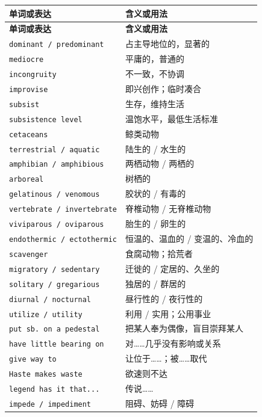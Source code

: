 \documentclass[UTF8,zihao=-4]{ctexart}
\begin{document}
\begin{longtable}{>{\raggedright\arraybackslash}p{4.9cm} >{\raggedright\arraybackslash}p{9.6cm}}
\toprule
\textbf{单词或表达} & \textbf{含义或用法} \\
\midrule
\endfirsthead
\toprule
\textbf{单词或表达} & \textbf{含义或用法} \\
\midrule
\endhead
\texttt{dominant / predominant} & 占主导地位的，显著的 \\
\texttt{mediocre} & 平庸的，普通的 \\
\texttt{incongruity} & 不一致，不协调 \\
\texttt{improvise} & 即兴创作；临时凑合 \\
\texttt{subsist} & 生存，维持生活 \\
\texttt{subsistence level} & 温饱水平，最低生活标准 \\
\texttt{cetaceans} & 鲸类动物 \\
\texttt{terrestrial / aquatic} & 陆生的 / 水生的 \\
\texttt{amphibian / amphibious} & 两栖动物 / 两栖的 \\
\texttt{arboreal} & 树栖的 \\
\texttt{gelatinous / venomous} & 胶状的 / 有毒的 \\
\texttt{vertebrate / invertebrate} & 脊椎动物 / 无脊椎动物 \\
\texttt{viviparous / oviparous} & 胎生的 / 卵生的 \\
\texttt{endothermic / ectothermic} & 恒温的、温血的 / 变温的、冷血的 \\
\texttt{scavenger} & 食腐动物；拾荒者 \\
\texttt{migratory / sedentary} & 迁徙的 / 定居的、久坐的 \\
\texttt{solitary / gregarious} & 独居的 / 群居的 \\
\texttt{diurnal / nocturnal} & 昼行性的 / 夜行性的 \\
\texttt{utilize / utility} & 利用 / 实用；公用事业 \\
\texttt{put sb. on a pedestal} & 把某人奉为偶像，盲目崇拜某人 \\
\texttt{have little bearing on} & 对……几乎没有影响或关系 \\
\texttt{give way to} & 让位于……；被……取代 \\
\texttt{Haste makes waste} & 欲速则不达 \\
\texttt{legend has it that...} & 传说…… \\
\texttt{impede / impediment} & 阻碍、妨碍 / 障碍 \\

\end{longtable}
\end{document}
